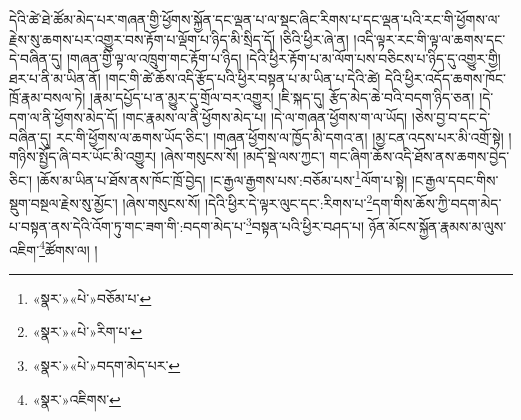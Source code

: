 དེའི་ཚེ་ཐེ་ཚོམ་མེད་པར་གཞན་གྱི་ཕྱོགས་སྐྱོན་དང་ལྡན་པ་ལ་སྡང་ཞིང་རིགས་པ་དང་ལྡན་པའི་རང་གི་ཕྱོགས་ལ་རྗེས་སུ་ཆགས་པར་འགྱུར་བས་རྟོག་པ་ལྡོག་པ་ཉིད་མི་སྲིད་དོ། །ཅིའི་ཕྱིར་ཞེ་ན། །འདི་ལྟར་རང་གི་ལྟ་ལ་ཆགས་དང་དེ་བཞིན་དུ། །གཞན་གྱི་ལྟ་ལ་འཁྲུག་གང་རྟོག་པ་ཉིད། །དེའི་ཕྱིར་རྟོག་པ་མ་ལོག་པས་བཅིངས་པ་ཉིད་དུ་འགྱུར་གྱི། ཐར་པ་ནི་མ་ཡིན་ནོ། །གང་གི་ཚེ་ཆོས་འདི་རྩོད་པའི་ཕྱིར་བསྟན་པ་མ་ཡིན་པ་དེའི་ཚེ། དེའི་ཕྱིར་འདོད་ཆགས་ཁོང་ཁྲོ་རྣམ་བསལ་ཏེ། །རྣམ་དཔྱོད་པ་ན་མྱུར་དུ་གྲོལ་བར་འགྱུར། །ཇི་སྐད་དུ། རྩོད་མེད་ཆེ་བའི་བདག་ཉིད་ཅན། །དེ་དག་ལ་ནི་ཕྱོགས་མེད་དོ། །གང་རྣམས་ལ་ནི་ཕྱོགས་མེད་པ། །དེ་ལ་གཞན་ཕྱོགས་ག་ལ་ཡོད། །ཅེས་བྱ་བ་དང་དེ་བཞིན་དུ། རང་གི་ཕྱོགས་ལ་ཆགས་ཡོད་ཅིང་། །གཞན་ཕྱོགས་ལ་ཁྱོད་མི་དགའ་ན། །མྱ་ངན་འདས་པར་མི་འགྲོ་སྟེ། །གཉིས་སྤྱོད་ཞི་བར་ཡོང་མི་འགྱུར། །ཞེས་གསུངས་སོ། །མདོ་སྡེ་ལས་ཀྱང་། གང་ཞིག་ཆོས་འདི་ཐོས་ནས་ཆགས་བྱེད་ཅིང་། །ཆོས་མ་ཡིན་པ་ཐོས་ནས་ཁོང་ཁྲོ་བྱེད། །ང་རྒྱལ་རྒྱགས་པས་:བཅོམ་པས་\footnote{«སྣར་»«པེ་»བཅོམ་པ་}ལོག་པ་སྟེ། །ང་རྒྱལ་དབང་གིས་སྡུག་བསྔལ་རྗེས་སུ་མྱོང་། །ཞེས་གསུངས་སོ། །དེའི་ཕྱིར་དེ་ལྟར་ལུང་དང་:རིགས་པ་\footnote{«སྣར་»«པེ་»རིག་པ་}དག་གིས་ཆོས་ཀྱི་བདག་མེད་པ་བསྟན་ནས་དེའི་འོག་ཏུ་གང་ཟག་གི་:བདག་མེད་པ་\footnote{«སྣར་»«པེ་»བདག་མེད་པར་}བསྟན་པའི་ཕྱིར་བཤད་པ། ཉོན་མོངས་སྐྱོན་རྣམས་མ་ལུས་འཇིག་\footnote{«སྣར་»འཇིགས་}ཚོགས་ལ། །
